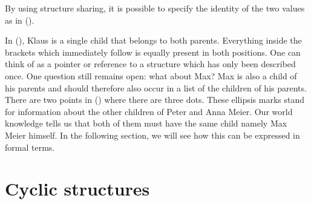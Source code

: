 By using structure sharing, it is possible to specify the identity of the two values as in ().
\begin{figure}
\ea
{}
\z
\vspace{-\baselineskip}
\end{figure}%
In (), Klaus is a single child that belongs to both parents. Everything inside the brackets which immediately follow  is equally present in both
positions. One can think of  as a pointer or reference to a structure which has only been described once. One question still remains open: what about Max?
Max is also a child of his parents and should therefore also occur in a list of the children of his parents. There are two points in () where there are three
dots. These ellipsis marks stand for information about the other children of Peter and Anna
Meier. Our world knowledge tells us that both of them must have the same child namely Max Meier himself. In the following section, we will see how this can be expressed in formal terms.%

\section{Cyclic structures}
\label{sec-cyclic-fd}

